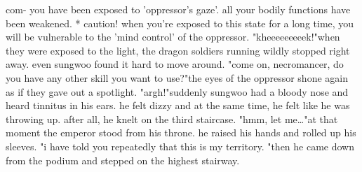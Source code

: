 com- you have been exposed to 'oppressor's gaze'.
 all your bodily functions have been weakened.
 * caution! when you're exposed to this state for a long time, you will be vulnerable to the 'mind control' of the oppressor.
 "kheeeeeeeeek!"when they were exposed to the light, the dragon soldiers running wildly stopped right away.
 even sungwoo found it hard to move around.
"come on, necromancer, do you have any other skill you want to use?"the eyes of the oppressor shone again as if they gave out a spotlight.
"argh!"suddenly sungwoo had a bloody nose and heard tinnitus in his ears.
 he felt dizzy and at the same time, he felt like he was throwing up.
after all, he knelt on the third staircase.
"hmm, let me…"at that moment the emperor stood from his throne.
 he raised his hands and rolled up his sleeves.
"i have told you repeatedly that this is my territory.
"then he came down from the podium and stepped on the highest stairway.

